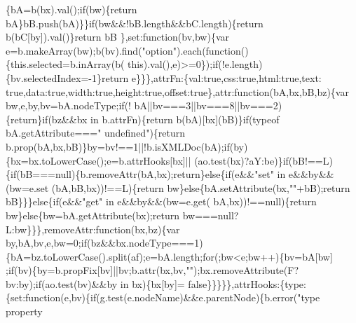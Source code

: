\begin{DoxyCode}
      \{bA=b(bx).val();\textcolor{keywordflow}{if}(bw)\{\textcolor{keywordflow}{return} bA\}bB.push(bA)\}\}\textcolor{keywordflow}{if}(bw&&!bB.length&&bC.length)\{\textcolor{keywordflow}{return} b(bC[by]).val()\}\textcolor{keywordflow}{return} bB
      \},set:\textcolor{keyword}{function}(bv,bw)\{var e=b.makeArray(bw);b(bv).find(\textcolor{stringliteral}{"option"}).each(\textcolor{keyword}{function}()\{this.selected=b.inArray(b(\textcolor{keyword}{
      this}).val(),e)>=0\});\textcolor{keywordflow}{if}(!e.length)\{bv.selectedIndex=-1\}\textcolor{keywordflow}{return} e\}\}\},attrFn:\{val:\textcolor{keyword}{true},css:\textcolor{keyword}{true},html:\textcolor{keyword}{true},text:\textcolor{keyword}{
      true},data:\textcolor{keyword}{true},width:\textcolor{keyword}{true},height:\textcolor{keyword}{true},offset:\textcolor{keyword}{true}\},attr:\textcolor{keyword}{function}(bA,bx,bB,bz)\{var bw,e,by,bv=bA.nodeType;\textcolor{keywordflow}{if}(!
      bA||bv===3||bv===8||bv===2)\{\textcolor{keywordflow}{return}\}\textcolor{keywordflow}{if}(bz&&bx in b.attrFn)\{\textcolor{keywordflow}{return} b(bA)[bx](bB)\}\textcolor{keywordflow}{if}(typeof bA.getAttribute===\textcolor{stringliteral}{"
      undefined"})\{\textcolor{keywordflow}{return} b.prop(bA,bx,bB)\}by=bv!==1||!b.isXMLDoc(bA);\textcolor{keywordflow}{if}(by)\{bx=bx.toLowerCase();e=b.attrHooks[bx]||
      (ao.test(bx)?aY:be)\}\textcolor{keywordflow}{if}(bB!==L)\{\textcolor{keywordflow}{if}(bB===null)\{b.removeAttr(bA,bx);\textcolor{keywordflow}{return}\}\textcolor{keywordflow}{else}\{\textcolor{keywordflow}{if}(e&&\textcolor{stringliteral}{"set"} in e&&by&&(bw=e.set
      (bA,bB,bx))!==L)\{\textcolor{keywordflow}{return} bw\}\textcolor{keywordflow}{else}\{bA.setAttribute(bx,\textcolor{stringliteral}{""}+bB);\textcolor{keywordflow}{return} bB\}\}\}\textcolor{keywordflow}{else}\{\textcolor{keywordflow}{if}(e&&\textcolor{stringliteral}{"get"} in e&&by&&(bw=e.get(
      bA,bx))!==null)\{\textcolor{keywordflow}{return} bw\}\textcolor{keywordflow}{else}\{bw=bA.getAttribute(bx);\textcolor{keywordflow}{return} bw===null?L:bw\}\}\},removeAttr:\textcolor{keyword}{function}(bx,bz)\{var
       by,bA,bv,e,bw=0;\textcolor{keywordflow}{if}(bz&&bx.nodeType===1)\{bA=bz.toLowerCase().split(af);e=bA.length;\textcolor{keywordflow}{for}(;bw<e;bw++)\{bv=bA[bw]
      ;\textcolor{keywordflow}{if}(bv)\{by=b.propFix[bv]||bv;b.attr(bx,bv,\textcolor{stringliteral}{""});bx.removeAttribute(F?bv:by);\textcolor{keywordflow}{if}(ao.test(bv)&&by in bx)\{bx[by]=\textcolor{keyword}{
      false}\}\}\}\}\},attrHooks:\{type:\{set:\textcolor{keyword}{function}(e,bv)\{\textcolor{keywordflow}{if}(g.test(e.nodeName)&&e.parentNode)\{b.error(\textcolor{stringliteral}{"type property
}
\end{DoxyCode}

